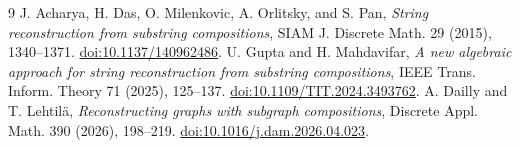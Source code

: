 \documentclass[11pt]{article}
\begin{document}
\begin{thebibliography}{9}
 J. Acharya, H. Das, O. Milenkovic, A. Orlitsky, and S. Pan,
\emph{String reconstruction from substring compositions}, SIAM J. Discrete Math. 29 (2015), 1340--1371. \href{https://doi.org/10.1137/140962486}{doi:10.1137/140962486}.
 U. Gupta and H. Mahdavifar, \emph{A new algebraic approach for string reconstruction from substring compositions}, IEEE Trans. Inform. Theory 71 (2025), 125--137. \href{https://doi.org/10.1109/TIT.2024.3493762}{doi:10.1109/TIT.2024.3493762}.
 A. Dailly and T. Lehtil\"a, \emph{Reconstructing graphs with subgraph compositions}, Discrete Appl. Math. 390 (2026), 198--219. \href{https://doi.org/10.1016/j.dam.2026.04.023}{doi:10.1016/j.dam.2026.04.023}.
\end{thebibliography}
\end{document}
